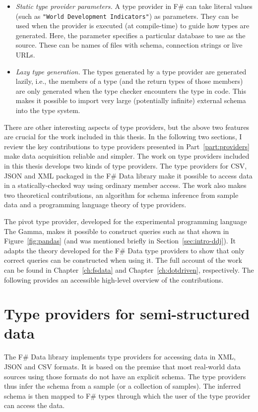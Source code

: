 \documentclass[fleqn,11pt]{report}
\theoremstyle{definition}
\newenvironment{nitemize}
{ \vspace{-0.4em}
  \begin{itemize}
    \setlength{\itemsep}{5pt}
    \setlength{\parskip}{0pt}
    \setlength{\parsep}{0pt} }
{ \end{itemize}
  \vspace{-0.4em} }
\begin{document}
\begin{nitemize}
\item \emph{Static type provider parameters.} A type provider in F\# can take literal values
  (such as \texttt{"World Development Indicators"}) as parameters. They can be used when the provider
  is executed (at compile-time) to guide how types are generated. Here, the parameter specifies
  a particular database to use as the source. These can be names of files with schema, connection
  strings or live URLs.

\item \emph{Lazy type generation.} The types generated by a type provider are generated lazily, i.e.,
  the members of a type (and the return types of those members) are only generated when the type
  checker encounters the type in code. This makes it possible to import very large (potentially
  infinite) external schema into the type system.
\end{nitemize}

There are other interesting aspects of type providers, but the above two features are crucial
for the work included in this thesis. In the following two sections, I review the key contributions
to type providers presented in Part~\ref{part:providers} make data acquisition reliable
and simpler.
%
The work on type providers included in this thesis develops two kinds of type providers.
The type providers for CSV, JSON and XML packaged in the F\# Data library make it possible
to access data in a statically-checked way using ordinary member access. The work also makes
two theoretical contributions, an algorithm for schema inference from sample data and a
programming language theory of type providers.

The pivot type provider, developed for the experimental programming language The Gamma,
makes it possible to construct queries such as that shown in Figure~\ref{fig:pandas} (and
was mentioned briefly in Section~\ref{sec:intro-ddj}). It adapts the theory developed for the
F\# Data type providers to show that only correct queries can be constructed when using it.
%
The full account of the work can be found in Chapter~\ref{ch:fsdata} and
Chapter~\ref{ch:dotdriven}, respectively. The following provides an accessible high-level overview
of the contributions.

\section{Type providers for semi-structured data}
The F\# Data library implements type providers for accessing data in XML, JSON and CSV formats.
It is based on the premise that most real-world data sources using those formats do not have an
explicit schema. The type providers thus infer the schema from a sample (or a collection of
samples). The inferred schema is then mapped to F\# types through which the user of the type
provider can access the data.
\end{document}
